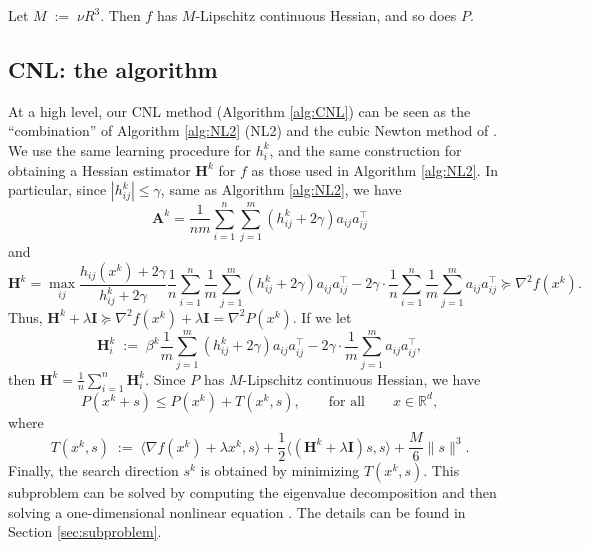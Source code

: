 \documentclass[12pt]{article}
\newcommand{\eqdef}{\; { := }\;}
\newcommand{\R}{\mathbb{R}}
\newcommand{\newalpha}{h}
\newcommand{\mA}{\mathbf{A}}
\newcommand{\mH}{\mathbf{H}}
\newcommand{\mI}{\mathbf{I}}
\begin{document}
Let $M \eqdef \nu R^3$. Then $f$ has $M$-Lipschitz continuous Hessian, and so does $P$. 

\subsection{{\sf CNL}: the algorithm}



  At a high level, our {\sf CNL} method (Algorithm \ref{alg:CNL}) can be seen as the ``combination'' of  Algorithm \ref{alg:NL2} ({\sf NL2}) and the cubic Newton method of \citet{Griewank-cubic-1981, PN2006-cubic}. We use the same learning procedure for $h_i^k$, and the same construction for obtaining a Hessian estimator $\mH^k$ for $f$ as those used in Algorithm \ref{alg:NL2}. In particular, since $|h_{ij}^k| \leq \gamma$, same as Algorithm \ref{alg:NL2}, we have 
$$
\mA^k = \frac{1}{nm} \sum_{i=1}^n \sum_{j=1}^{m}(h_{ij}^k + 2\gamma) a_{ij}a_{ij}^\top
$$ 
and  $$\mH^k = \max_{ij} \frac{\newalpha_{ij}(x^k) + 2\gamma}{h_{ij}^k + 2\gamma} \frac{1}{n} \sum_{i=1}^n \frac{1}{m}\sum_{j=1}^{m}(h_{ij}^k + 2\gamma) a_{ij}a_{ij}^\top - 2\gamma \cdot \frac{1}{n} \sum_{i=1}^n \frac{1}{m} \sum_{j=1}^{m}a_{ij}a_{ij}^\top \succeq \nabla^2 f(x^k).$$ Thus, $\mH^k + \lambda \mI \succeq \nabla^2 f(x^k) + \lambda \mI = \nabla^2 P(x^k)$. If we let $$\mH_i^k \eqdef \beta^k \frac{1}{m}\sum_{j=1}^{m}(h_{ij}^k + 2\gamma) a_{ij}a_{ij}^\top - 2\gamma \cdot \frac{1}{m} \sum_{j=1}^{m}a_{ij}a_{ij}^\top,$$ then $\mH^k = \frac{1}{n} \sum_{i=1}^n \mH^k_i$.  Since $P$ has $M$-Lipschitz continuous Hessian, we have $$P(x^k+s) \leq P(x^k) + T(x^k, s), \qquad \text{for all} \qquad x\in \R^d,$$ where 
$$
T(x^k, s) \eqdef \langle \nabla f(x^k) + \lambda x^k, s \rangle + \frac{1}{2} \langle (\mH^k + \lambda \mI)s, s \rangle + \frac{M}{6}\|s\|^3. 
$$
Finally, the search direction $s^k$ is obtained by minimizing $T(x^k, s)$. This subproblem can be solved by computing the eigenvalue decomposition and then solving a one-dimensional nonlinear equation \citep{hanzely2020stochastic,gould2010solving}. The details can be found in Section \ref{sec:subproblem}. 
\end{document}
